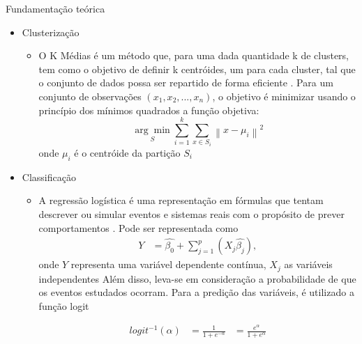 \documentclass[final,hyperref={pdfpagelabels=false, brazil}]{beamer}
\begin{document}
\begin{frame}[t]
\begin{columns}[t]
\begin{column}{.465\textwidth}
\begin{block}{Fundamenta\c c\~ao te\'orica}

\begin{itemize}
\item Clusterização
\begin{itemize}
\item O K Médias é um método que, para uma dada quantidade k de clusters, tem como o objetivo de definir k centróides, um para cada cluster, tal que o conjunto de dados possa ser repartido de forma eficiente \cite{MacQueen}. Para um conjunto de observações \begin{math}(x_{1}, x_{2}, ..., x_{n})\end{math}, o objetivo é minimizar usando o princípio dos mínimos quadrados a função objetiva:
\begin{equation}
\label{eq:media}
\underset{S}{\arg\min} \sum_{i=1}^{k} \sum_{x \in S_{i}}\left \| x - \mu_{i} \right \|^{2}
\end{equation}
onde \begin{math}\mu_{i}\end{math} é o centróide da partição \begin{math}S_{i}\end{math}

\end{itemize}
\item Classificação
\begin{itemize}
\item A regressão logística é uma representação em fórmulas que tentam descrever ou simular eventos e sistemas reais com o propósito de prever comportamentos \cite{HASTIE}. Pode ser representada como
\begin{equation}
  \label{eq:regressao_linear}
  \begin{aligned}
Y &= \hat{\beta_{0}} + \sum_{j=1}^{p} (X_{j}\hat{\beta_{j}}), 
  \end{aligned}  
\end{equation}
onde \begin{math}Y\end{math} representa uma variável dependente contínua, \begin{math}X_{j}\end{math} as variáveis independentes 
Além disso, leva-se em consideração a probabilidade de que os eventos estudados ocorram. Para a predição das variáveis, é utilizado a função logit

\begin{equation}
  \label{eq:t}
  \begin{aligned}
    logit^{-1}(\alpha) &= \frac{1}{1+e^{-\alpha}} &= \frac{e^{\alpha}}{1+e^{\alpha}}
  \end{aligned}
\end{equation}


\end{itemize}
\end{itemize}
\end{block}
\end{column}
\end{columns}
\end{frame}
\end{document}

